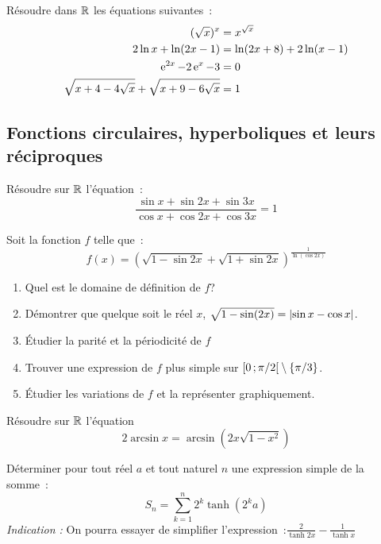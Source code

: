 \begin{exercice}
    Résoudre dans \(\mathbb{R}\) les équations suivantes~:
    \begin{align}
        (\sqrt{x})^x &= x^{\sqrt{x}} \\
        2\ln x + \ln(2x-1) &= \ln(2x+8) + 2\ln(x-1) \\
        \operatorname{e}^{2x} -2\operatorname{e}^x-3 &=0 \\
        \sqrt{x+4-4\sqrt{x}} + \sqrt{x+9-6\sqrt{x}} &= 1
    \end{align}
\end{exercice}
\subsection{Fonctions circulaires, hyperboliques et leurs réciproques}
\begin{exercice}
    Résoudre sur \(\mathbb{R}\) l'équation~:
    \begin{equation}
        \frac{\sin x + \sin 2x + \sin 3x}{\cos x + \cos 2x + \cos 3x} = 1
    \end{equation}
\end{exercice}
\begin{exercice}
    Soit la fonction \(f\) telle que~:
    \begin{equation}
        f(x) = (\sqrt{1-\sin 2x}+\sqrt{1+\sin 2x})^{\frac{1}{\ln(\cos 2x)}}
    \end{equation}
    \begin{enumerate}
        \item Quel est le domaine de définition de \(f\)?
        \item Démontrer que quelque soit le réel \(x\), \(\sqrt{1-\sin(2x)} = 
            \left\lvert\sin x - \cos x\right\rvert\).
        \item Étudier la parité et la périodicité de \(f\)
        \item Trouver une expression de \(f\) plus simple sur 
            \(\left[ 0 \, ;  \pi/2 \right[\setminus\{\pi/3\}\).
        \item Étudier les variations de \(f\) et la représenter graphiquement.
    \end{enumerate}
\end{exercice}
\begin{exercice}
    Résoudre sur \(\mathbb{R}\) l'équation
    \begin{equation}
        2\arcsin x = \arcsin(2x\sqrt{1-x^2})
    \end{equation}
\end{exercice}
\begin{exercice}
    Déterminer pour tout réel \(a\) et tout naturel \(n\) une expression simple 
    de la somme~:
    \begin{equation}
        S_n = \sum_{k=1}^n 2^k \tanh(2^k a)
    \end{equation}
    \emph{Indication :} On pourra essayer de simplifier 
    l'expression~:\(\frac{2}{\tanh 2x} - \frac{1}{\tanh x}\)
\end{exercice}
